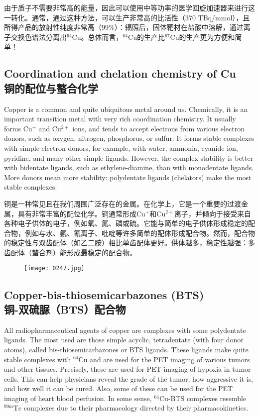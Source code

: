 \documentclass[dvipsnames, svgnames,a4paper,11pt]{article}
\begin{document}
由于质子不需要非常高的能量，因此可以使用中等功率的医学回旋加速器来进行这一转化。通常，通过这种方法，可以生产非常高的比活性（370 TBq/mmol），且所得产品的放射性纯度非常高（99\%）：辐照后，固体靶材在盐酸中溶解，通过离子交换色谱法分离出\(\mathrm{^{64}Cu}\)。总体而言，\(\mathrm{^{64}Cu}\)的生产比\(\mathrm{^{67}Cu}\)的生产更为方便和简单！

\subsection{Coordination and chelation chemistry of Cu\\ 铜的配位与螯合化学}  
Copper is a common and quite ubiquitous metal around us. Chemically, it is an important transition metal with very rich coordination chemistry. It usually forms \(\mathrm{Cu^+}\) and \(\mathrm{Cu^{2+}}\) ions, and tends to accept electrons from various electron donors, such as oxygen, nitrogen, phosphorus, or sulfur. It forms stable complexes with simple electron donors, for example, with water, ammonia, cyanide ion, pyridine, and many other simple ligands. However, the complex stability is better with bidentate ligands, such as ethylene-diamine, than with monodentate ligands. More donors mean more stability: polydentate ligands (chelators) make the most stable complexes.

铜是一种常见且在我们周围广泛存在的金属。在化学上，它是一个重要的过渡金属，具有非常丰富的配位化学。铜通常形成\(\mathrm{Cu^+}\)和\(\mathrm{Cu^{2+}}\)离子，并倾向于接受来自各种电子供体的电子，例如氧、氮、磷或硫。它能与简单的电子供体形成稳定的配合物，例如与水、氨、氰离子、吡啶等许多简单的配体形成配合物。然而，配合物的稳定性与双齿配体（如乙二胺）相比单齿配体更好。供体越多，稳定性越强：多齿配体（螯合剂）能形成最稳定的配合物。

\begin{figure}[h]
	\centering
    \texttt{[image: 0247.jpg]}  
     \label{fig330}
\end{figure}

\subsection{Copper-bis-thiosemicarbazones (BTS) \\铜-双硫脲（BTS）配合物}  
All radiopharmaceutical agents of copper are complexes with some polydentate ligands. The most used are those simple acyclic, tetradentate (with four donor atoms), called bis-thiosemicarbazones or BTS ligands. These ligands make quite stable complexes with \(\mathrm{^{64}Cu}\) and are used for the PET imaging of various tumors and other tissues. Precisely, these are used for PET imaging of hypoxia in tumor cells. This can help physicians reveal the grade of the tumor, how aggressive it is, and how well it can be cured. Also, some of these can be used for the PET imaging of heart blood perfusion. In some sense, \(\mathrm{^{64}Cu}\)-BTS complexes resemble \(\mathrm{^{99m}Tc}\) complexes due to their pharmacology directed by their pharmacokinetics.
\end{document}
